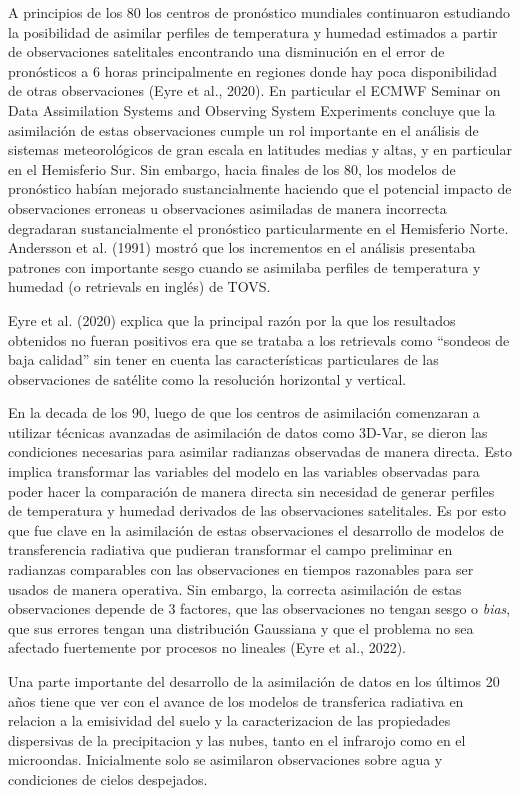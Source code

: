 \documentclass[12pt,oneside,a4paper]{reedthesis}
\begin{document}
A principios de los 80 los centros de pronóstico mundiales continuaron estudiando la posibilidad de asimilar perfiles de temperatura y humedad estimados a partir de observaciones satelitales encontrando una disminución en el error de pronósticos a 6 horas principalmente en regiones donde hay poca disponibilidad de otras observaciones (Eyre et al., 2020). En particular el ECMWF Seminar on Data Assimilation Systems and Observing System Experiments concluye que la asimilación de estas observaciones cumple un rol importante en el análisis de sistemas meteorológicos de gran escala en latitudes medias y altas, y en particular en el Hemisferio Sur. Sin embargo, hacia finales de los 80, los modelos de pronóstico habían mejorado sustancialmente haciendo que el potencial impacto de observaciones erroneas u observaciones asimiladas de manera incorrecta degradaran sustancialmente el pronóstico particularmente en el Hemisferio Norte. Andersson et al. (1991) mostró que los incrementos en el análisis presentaba patrones con importante sesgo cuando se asimilaba perfiles de temperatura y humedad (o retrievals en inglés) de TOVS.

Eyre et al. (2020) explica que la principal razón por la que los resultados obtenidos no fueran positivos era que se trataba a los retrievals como ``sondeos de baja calidad'' sin tener en cuenta las características particulares de las observaciones de satélite como la resolución horizontal y vertical.

En la decada de los 90, luego de que los centros de asimilación comenzaran a utilizar técnicas avanzadas de asimilación de datos como 3D-Var, se dieron las condiciones necesarias para asimilar radianzas observadas de manera directa. Esto implica transformar las variables del modelo en las variables observadas para poder hacer la comparación de manera directa sin necesidad de generar perfiles de temperatura y humedad derivados de las observaciones satelitales. Es por esto que fue clave en la asimilación de estas observaciones el desarrollo de modelos de transferencia radiativa que pudieran transformar el campo preliminar en radianzas comparables con las observaciones en tiempos razonables para ser usados de manera operativa. Sin embargo, la correcta asimilación de estas observaciones depende de 3 factores, que las observaciones no tengan sesgo o \emph{bias}, que sus errores tengan una distribución Gaussiana y que el problema no sea afectado fuertemente por procesos no lineales (Eyre et al., 2022).

Una parte importante del desarrollo de la asimilación de datos en los últimos 20 años tiene que ver con el avance de los modelos de transferica radiativa en relacion a la emisividad del suelo y la caracterizacion de las propiedades dispersivas de la precipitacion y las nubes, tanto en el infrarojo como en el microondas. Inicialmente solo se asimilaron observaciones sobre agua y condiciones de cielos despejados.
\end{document}
